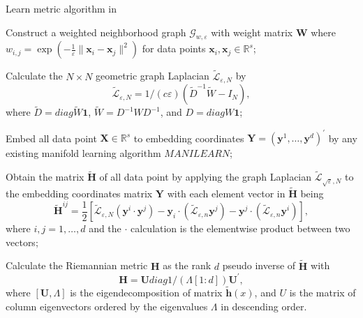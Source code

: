 \documentclass[11pt,a4paper,]{article}
\begin{document}
\begin{algorithm}[!htb]
  \caption{Learn metric algorithm in \cite{Perrault-Joncas2013-pq} }
  \label{alg:learnmetric}
  \DontPrintSemicolon
  \SetAlgoLined
  \BlankLine
  \begin{algorithmic}[1]

  \STATE Construct a weighted neighborhood graph $\mathcal{G}_{w,\varepsilon}$ with weight matrix $\pmb{W}$ where $w_{i,j}=\exp(-\frac{1}{\varepsilon}\|\pmb{x}_i-\pmb{x}_j\|^2)$ for data points $\pmb{x}_i,\pmb{x}_j \in \mathbb{R}^s$;

  \STATE Calculate the $N\times N$ geometric graph Laplacian $\widetilde{\mathcal{L}}_{\varepsilon,N}$ by
  $$
  \widetilde{\mathcal{L}}_{\varepsilon,N} = 1/(c\varepsilon)(\widetilde{D}^{-1} \widetilde{W} - I_N),
  $$
  where $\widetilde{D}=diag{\widetilde{W}\pmb{1}}$, $\widetilde{W} = D^{-1}WD^{-1}$, and $D = diag{W\pmb{1}}$;

  \STATE Embed all data point $\pmb{X}\in \mathbb{R}^s$ to embedding coordinates $\pmb{Y}=(\pmb{y}^1,\dots,\pmb{y}^d)^\prime$ by any existing manifold learning algorithm $MANILEARN$;

  \STATE Obtain the matrix $\pmb{\tilde{H}}$ of all data point by applying the graph Laplacian $\widetilde{\mathcal{L}}_{\sqrt{\varepsilon},N}$ to the embedding coordinates matrix $\pmb{Y}$ with each element vector in $\pmb{\tilde{H}}$ being
  $$
    \pmb{\tilde{H}}^{i j} = \frac{1}{2} \left[\tilde{\mathcal{L}}_{\varepsilon, N}\left(\pmb{y}^i \cdot \pmb{y}^j\right) - \pmb{y}_i \cdot\left(\tilde{\mathcal{L}}_{\varepsilon, n} \pmb{y}^j\right) - \pmb{y}^j \cdot\left(\tilde{\mathcal{L}}_{\varepsilon, n} \pmb{y}^i\right)\right],
  $$
  where $i,j=1,\dots,d$ and the $\cdot$ calculation is the elementwise product between two vectors; 

  \STATE Calculate the Riemannian metric $\pmb{H}$ as the rank $d$ pseudo inverse of $\tilde{\pmb{H}}$ with 
  $$
    \pmb{H} = \pmb{U} diag{1/(\Lambda[1:d])} \pmb{U}^\prime,
  $$
  where $[\pmb{U}, \Lambda]$ is the eigendecomposition of matrix $\pmb{\tilde{h}}(x)$, and $U$ is the matrix of column eigenvectors ordered by the eigenvalues $\Lambda$ in descending order.

  \end{algorithmic}
\end{algorithm}
\end{document}
